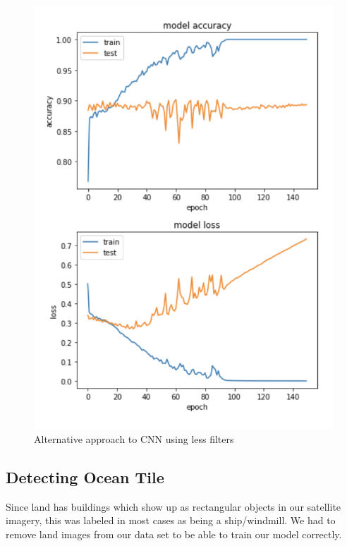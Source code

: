 \begin{figure}[ht]
\begin{center}
\centerline{\includegraphics[width=\columnwidth]{images/cnn-training-naive.png}}
\caption{Alternative approach to CNN using less filters}
\label{cnn-naive}
\end{center}
\end{figure}

\subsection{Detecting Ocean Tile}

Since land has buildings which show up as rectangular objects in our satellite imagery, this was labeled in most cases as being a ship/windmill. We had to remove land images from our data set to be able to train our model correctly.\\

